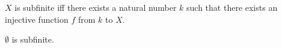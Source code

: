 


\begin{definition}\label{subfinite}
    $X$ is subfinite iff
        there exists a natural number $k$ such that
        there exists an injective function $f$ from $k$ to $X$.
\end{definition}

\begin{proposition}\label{emptyset_subfinite}
    $\emptyset$ is subfinite.
\end{proposition}
